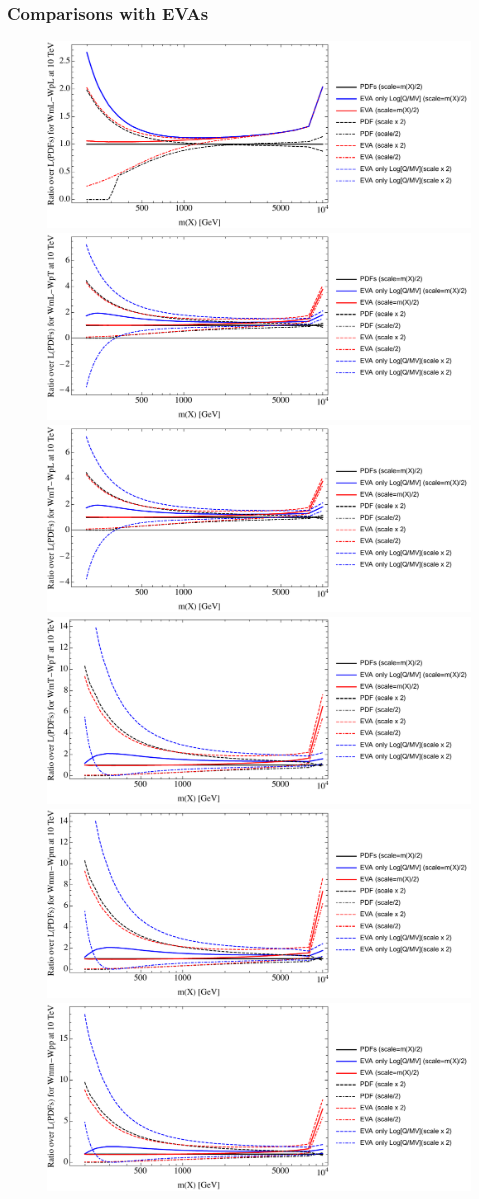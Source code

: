 \documentclass[a4paper,11pt]{article}
\begin{document}
\clearpage
\subsubsection{Comparisons with EVAs}

\begin{figure}[ht]
\includegraphics[width=0.4\linewidth]{PlotLumi/10TeV/ratios/WmL-WpL.pdf}
\includegraphics[width=0.4\linewidth]{PlotLumi/10TeV/ratios/WmL-WpT.pdf}
\includegraphics[width=0.4\linewidth]{PlotLumi/10TeV/ratios/WmT-WpL.pdf}
\includegraphics[width=0.4\linewidth]{PlotLumi/10TeV/ratios/WmT-WpT.pdf}
\includegraphics[width=0.4\linewidth]{PlotLumi/10TeV/ratios/Wmm-Wpm.pdf}
\includegraphics[width=0.4\linewidth]{PlotLumi/10TeV/ratios/Wmm-Wpp.pdf}
\end{figure}
\end{document}
